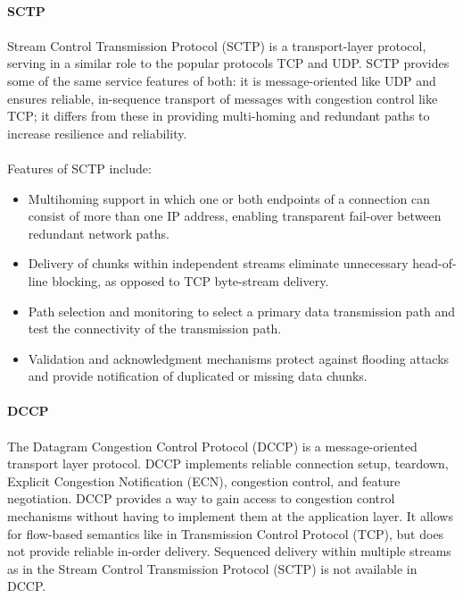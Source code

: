 \paragraph{} \textbf{SCTP}
\paragraph{}
Stream Control Transmission Protocol (SCTP) is a transport-layer protocol, serving in a similar role to the popular protocols TCP and UDP. SCTP provides some of the same service features of both: it is message-oriented like UDP and ensures reliable, in-sequence transport of messages with congestion control like TCP; it differs from these in providing multi-homing and redundant paths to increase resilience and reliability.
\paragraph{}
Features of SCTP include:
\begin{itemize}
\item Multihoming support in which one or both endpoints of a connection can consist of more than one IP address, enabling transparent fail-over between redundant network paths.
\item Delivery of chunks within independent streams eliminate unnecessary head-of-line blocking, as opposed to TCP byte-stream delivery.
\item Path selection and monitoring to select a primary data transmission path and test the connectivity of the transmission path.
\item Validation and acknowledgment mechanisms protect against flooding attacks and provide notification of duplicated or missing data chunks.
\end{itemize}

\paragraph{} \textbf{DCCP}
\paragraph{}
The Datagram Congestion Control Protocol (DCCP) is a message-oriented transport layer protocol. DCCP implements reliable connection setup, teardown, Explicit Congestion Notification (ECN), congestion control, and feature negotiation. DCCP provides a way to gain access to congestion control mechanisms without having to implement them at the application layer. It allows for flow-based semantics like in Transmission Control Protocol (TCP), but does not provide reliable in-order delivery. Sequenced delivery within multiple streams as in the Stream Control Transmission Protocol (SCTP) is not available in DCCP.
